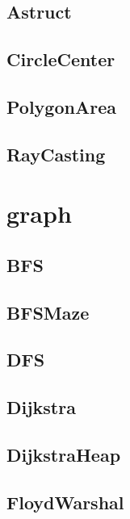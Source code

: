 \subsection{ Astruct}
\raggedbottom
\hrulefill
\subsection{ CircleCenter}
\raggedbottom
\hrulefill
\subsection{ PolygonArea}
\raggedbottom
\hrulefill
\subsection{ RayCasting}
\raggedbottom
\hrulefill

\section{graph}
\subsection{ BFS}
\raggedbottom
\hrulefill
\subsection{ BFSMaze}
\raggedbottom
\hrulefill
\subsection{ DFS}
\raggedbottom
\hrulefill
\subsection{ Dijkstra}
\raggedbottom
\hrulefill
\subsection{ DijkstraHeap}
\raggedbottom
\hrulefill
\subsection{ FloydWarshal}
\raggedbottom
\hrulefill
